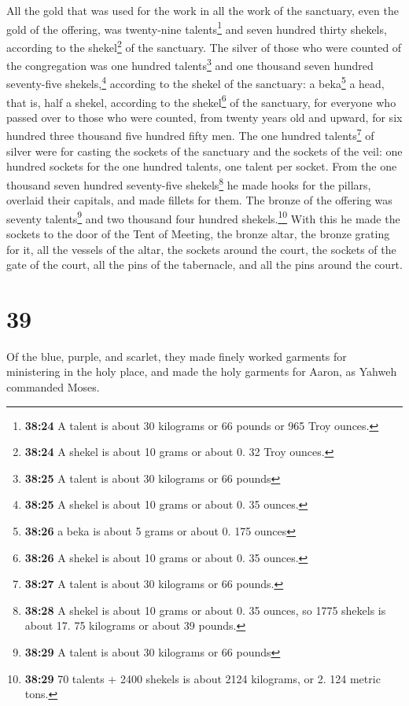  All the gold that was used for the work in all the work
of the sanctuary, even the gold of the offering, was twenty-nine
talents\footnote{\textbf{38:24} A talent is about 30 kilograms or 66
  pounds or 965 Troy ounces.} and seven hundred thirty shekels,
according to the shekel\footnote{\textbf{38:24} A shekel is about 10
  grams or about 0. 32 Troy ounces.} of the sanctuary. 
The silver of those who were counted of the congregation was one hundred
talents\footnote{\textbf{38:25} A talent is about 30 kilograms or 66
  pounds} and one thousand seven hundred seventy-five
shekels,\footnote{\textbf{38:25} A shekel is about 10 grams or about 0.
  35 ounces.} according to the shekel of the sanctuary: 
a beka\footnote{\textbf{38:26} a beka is about 5 grams or about 0. 175
  ounces} a head, that is, half a shekel, according to the
shekel\footnote{\textbf{38:26} A shekel is about 10 grams or about 0. 35
  ounces.} of the sanctuary, for everyone who passed over to those who
were counted, from twenty years old and upward, for six hundred three
thousand five hundred fifty men.  The one hundred
talents\footnote{\textbf{38:27} A talent is about 30 kilograms or 66
  pounds.} of silver were for casting the sockets of the sanctuary and
the sockets of the veil: one hundred sockets for the one hundred
talents, one talent per socket.  From the one thousand
seven hundred seventy-five shekels\footnote{\textbf{38:28} A shekel is
  about 10 grams or about 0. 35 ounces, so 1775 shekels is about 17. 75
  kilograms or about 39 pounds.} he made hooks for the pillars, overlaid
their capitals, and made fillets for them.  The bronze of
the offering was seventy talents\footnote{\textbf{38:29} A talent is
  about 30 kilograms or 66 pounds} and two thousand four hundred
shekels.\footnote{\textbf{38:29} 70 talents + 2400 shekels is about 2124
  kilograms, or 2. 124 metric tons.}  With this he made
the sockets to the door of the Tent of Meeting, the bronze altar, the
bronze grating for it, all the vessels of the altar,  the
sockets around the court, the sockets of the gate of the court, all the
pins of the tabernacle, and all the pins around the court.

\hypertarget{section-38}{%
\section{39}\label{section-38}}

 Of the blue, purple, and scarlet, they made finely worked
garments for ministering in the holy place, and made the holy garments
for Aaron, as Yahweh commanded Moses.

